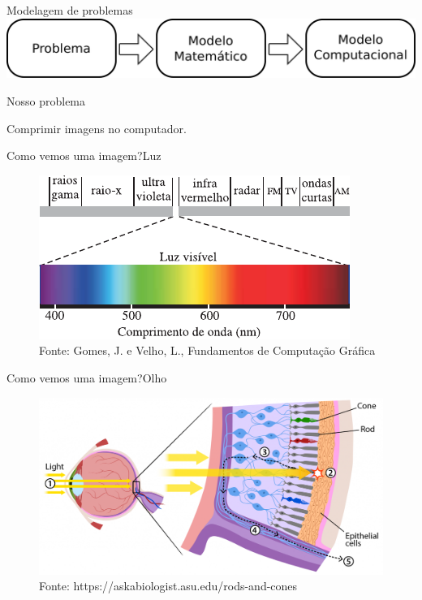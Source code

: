 \documentclass{beamer}
\begin{document}
\begin{frame}{Modelagem de problemas}
    \includegraphics[width=\textwidth]{figs/paradigmas.pdf}
\end{frame}

\begin{frame}{Nosso problema}
    \begin{center}
    Comprimir imagens no computador.
    \end{center}
\end{frame}

\begin{frame}{Como vemos uma imagem?}{Luz}
    \begin{figure}
        \centering
        \includegraphics[scale=1.0]{figs/espectro-luz.pdf}
        \caption{Fonte: Gomes, J. e Velho, L., Fundamentos de Computa\c{c}\~ao
        Gr\'afica}
    \end{figure}
\end{frame}

\begin{frame}{Como vemos uma imagem?}{Olho}
    \begin{figure}
        \centering
        \includegraphics[width=\textwidth]{figs/rods-cones.png}
        \caption{Fonte: https://askabiologist.asu.edu/rods-and-cones}
    \end{figure}
\end{frame}
\end{document}
